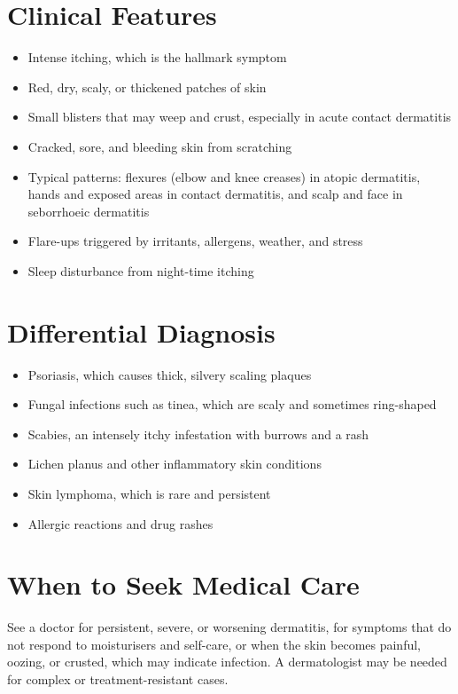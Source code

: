 \section*{Clinical Features}
\begin{itemize}
    \item Intense itching, which is the hallmark symptom
    \item Red, dry, scaly, or thickened patches of skin
    \item Small blisters that may weep and crust, especially in acute contact dermatitis
    \item Cracked, sore, and bleeding skin from scratching
    \item Typical patterns: flexures (elbow and knee creases) in atopic dermatitis, hands and exposed areas in contact dermatitis, and scalp and face in seborrhoeic dermatitis
    \item Flare-ups triggered by irritants, allergens, weather, and stress
    \item Sleep disturbance from night-time itching
\end{itemize}

\section*{Differential Diagnosis}
\begin{itemize}
    \item Psoriasis, which causes thick, silvery scaling plaques
    \item Fungal infections such as tinea, which are scaly and sometimes ring-shaped
    \item Scabies, an intensely itchy infestation with burrows and a rash
    \item Lichen planus and other inflammatory skin conditions
    \item Skin lymphoma, which is rare and persistent
    \item Allergic reactions and drug rashes
\end{itemize}

\section*{When to Seek Medical Care}
See a doctor for persistent, severe, or worsening dermatitis, for symptoms that do not respond to moisturisers and self-care, or when the skin becomes painful, oozing, or crusted, which may indicate infection. A dermatologist may be needed for complex or treatment-resistant cases.

